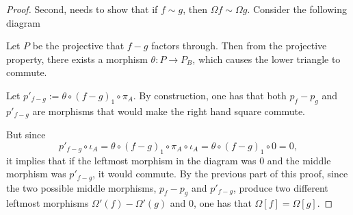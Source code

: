 \begin{proof}
    Second, needs to show that if \( f \sim g \), then \( \Omega f \sim \Omega g \). Consider the following diagram

    \begin{center}
    \end{center}

    Let \( P \) be the projective that \( f - g \) factors through. Then from the projective property, there exists a morphism \( \theta: P \to P_B \), which causes the lower triangle to commute.

    Let \( p'_{f - g} := \theta \circ (f - g)_1 \circ \pi_A \). By construction, one has that both \( p_f - p_g \) and \( p'_{f - g} \) are morphisms that would make the right hand square commute.
    
    But since
    \[
        p'_{f - g} \circ \iota_A = \theta \circ (f-g)_1 \circ \pi_A \circ \iota_A = \theta \circ (f-g)_1 \circ 0 = 0,
    \]
    it implies that if the leftmost morphism in the diagram was \( 0 \) and the middle morphism was \( p'_{f - g} \), it would commute. By the previous part of this proof, since the two possible middle morphisms, \( p_f - p_g \) and \( p'_{f - g} \), produce two different leftmost morphisms \( \Omega'(f) - \Omega'(g) \) and \( 0 \), one has that \( \Omega [f] = \Omega [g] \).
\end{proof}

